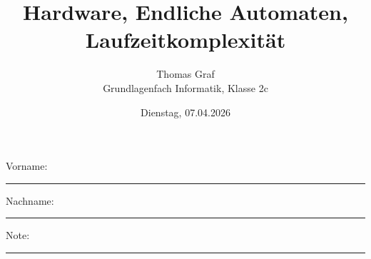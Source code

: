 \newtoggle{withbonus} \toggletrue{withbonus} %

\newcommand{\mycourse}{Grundlagenfach Informatik}
\newcommand{\mydate}{Dienstag, 07.04.2026}

\newcommand{\myclass}{Klasse 2c}
\title{\textbf{Hardware, Endliche Automaten, Laufzeitkomplexität}}
\author{Thomas Graf\\
	\mycourse, \myclass}
\date{\mydate}
\maketitle
\thispagestyle{headandfoot}

\begin{center}
\end{center}
\vspace{10mm}

\begin{center}
	Vorname: \rule{45mm}{0.8pt}\qquad Nachname: \rule{45mm}{0.8pt}
\end{center}
\vspace{20mm}

\begin{center}
	\iftoggle{withbonus} {
		\combinedgradetable[h][questions]
	} {
		\gradetable[h][questions]
	}
\end{center}
\vspace{15mm}
\begin{center}
	Note:
	\vspace{10mm}

	\rule{8mm}{1.2pt}
\end{center}
\clearpage


